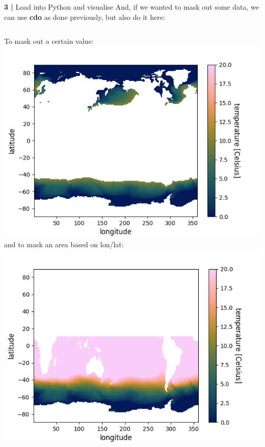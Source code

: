   
\begin{frame}{\textbf{3 |} Load into Python and visualise} 
    And, if we wanted to mask out some data, we can use \textbf{cdo} as done previously, but also do it here:\\
        \vspace{0.3cm}
    \begin{columns}
        \column[c]{6.5cm}
        To mask out a certain value:
            \vspace{0.5cm}
        \centering\includegraphics[scale=0.25]{images/Script1_fig5.png}
            \vspace{0.5cm}
        \column[c]{6.5cm}
        and to mask an area based on lon/lat:
            \vspace{0.3cm}
        \includegraphics[scale=0.25]{images/Script1_fig6.png}
            \vspace{0.3cm}
    \end{columns}
\end{frame}


